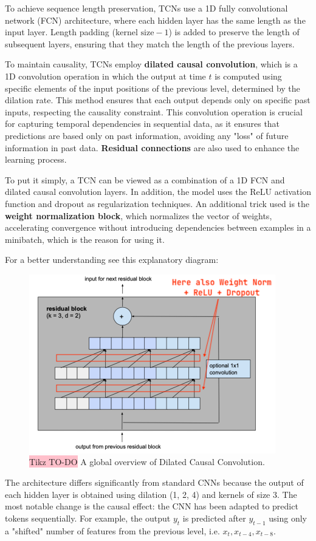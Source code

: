 To achieve sequence length preservation, TCNs use a 1D fully convolutional network (FCN) architecture, where each hidden layer has the same length as the input layer. Length padding ($\text{kernel size} - 1$) is added to preserve the length of subsequent layers, ensuring that they match the length of the previous layers.

To maintain causality, TCNs employ \textbf{dilated causal convolution}, which is a 1D convolution operation in which the output at time $t$ is computed using specific elements of the input positions of the previous level, determined by the dilation rate. This method ensures that each output depends only on specific past inputs, respecting the causality constraint. This convolution operation is crucial for capturing temporal dependencies in sequential data, as it ensures that predictions are based only on past information, avoiding any "loss" of future information in past data. \textbf{Residual connections} are also used to enhance the learning process.

To put it simply, a TCN can be viewed as a combination of a 1D FCN and dilated causal convolution layers. In addition, the model uses the ReLU activation function and dropout as regularization techniques. An additional trick used is the \textbf{weight normalization block}, which normalizes the vector of weights, accelerating convergence without introducing dependencies between examples in a minibatch, which is the reason for using it.

For a better understanding see this explanatory diagram:

\begin{figure}[!htbp]
    \centering
    \includegraphics[width=0.55\linewidth]{tikz/chapter8 - Temporal Convolutional Network.png}
    \caption{{\color{red}\colorbox{pink}{Tikz TO-DO}} A global overview of Dilated Causal Convolution.}
\end{figure}

The architecture differs significantly from standard CNNs because the output of each hidden layer is obtained using dilation (1, 2, 4) and kernels of size 3. The most notable change is the causal effect: the CNN has been adapted to predict tokens sequentially. For example, the output $y_t$ is predicted after $y_{t-1}$ using only a "shifted" number of features from the previous level, i.e. $x_t, x_{t-4}, x_{t-8}$.


